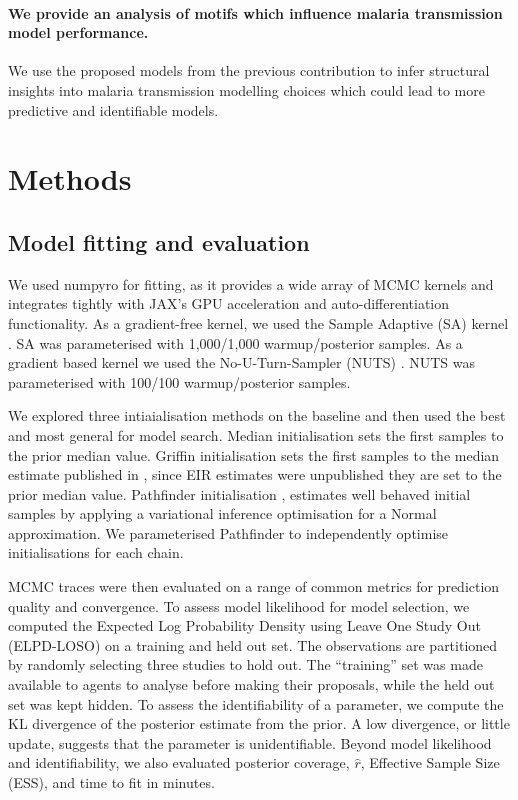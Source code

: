 \documentclass[11pt]{article}
\begin{document}
\paragraph{We provide an analysis of motifs which influence malaria transmission model performance.} We use the proposed models from the previous contribution to infer structural insights into malaria transmission modelling choices which could lead to more predictive and identifiable models.

\section{Methods}

\subsection{Model fitting and evaluation}

We used numpyro \citep{Phan2019Dec} for fitting, as it provides a wide array of MCMC kernels and integrates tightly with JAX's GPU acceleration and auto-differentiation functionality. As a gradient-free kernel, we used the Sample Adaptive (SA) kernel \citep{Zhu2019}. SA was parameterised with 1,000/1,000 warmup/posterior samples. As a gradient based kernel we used the No-U-Turn-Sampler (NUTS) \citep{Hoffman2011Nov}. NUTS was parameterised with 100/100 warmup/posterior samples.

We explored three intiaialisation methods on the baseline and then used the best and most general for model search. Median initialisation sets the first samples to the prior median value. Griffin initialisation sets the first samples to the median estimate published in \citet{griffin_estimates_2014}, since EIR estimates were unpublished they are set to the prior median value. Pathfinder initialisation \citep{Zhang2022}, estimates well behaved initial samples by applying a variational inference optimisation for a Normal approximation. We parameterised Pathfinder to independently optimise initialisations for each chain.

MCMC traces were then evaluated on a range of common metrics for prediction quality and convergence. To assess model likelihood for model selection, we computed the Expected Log Probability Density using Leave One Study Out (ELPD-LOSO) on a training and held out set. The observations are partitioned by randomly selecting three studies to hold out. The ``training'' set was made available to agents to analyse before making their proposals, while the held out set was kept hidden. To assess the identifiability of a parameter, we compute the KL divergence of the posterior estimate from the prior. A low divergence, or little update, suggests that the parameter is unidentifiable. Beyond model likelihood and identifiability, we also evaluated posterior coverage, $\hat{r}$, Effective Sample Size (ESS), and time to fit in minutes.
\end{document}
